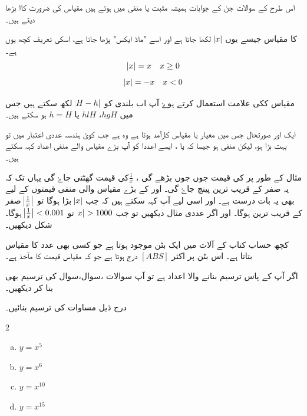 اس طرح کے سوالات جن کے جوابات ہمیشہ مثبت یا منفی میں ہوتے ہیں مقیاس کی ضرورت کاا بڑھا دیتے ہیں۔

 کا مقیاس جیسے یوں \(\abs{x}\) لکھا جاتا ہے اور اسے "ماڈ ایکس" پڑھا جاتا ہے، اسکی تعریف کچھ یوں ہے۔
\[\abs{x}=x\quad x\ge 0\]
\[\abs{x}=-x\quad x<0\]


مقیاس ککی علامت استعمال کرتے ہوۓ آپ اب بلندی کو \( \abs{H-h}  \) لکھ سکتے ہیں جس میں \( hgH \)، \( hlH \) یا \( h= H \) ہو سکتے ہیں۔
 



 ایک اور صورتحال جس میں معیار یا مقیاس کارآمد ہوتا ہے وہ ہے جب کوئ ہندسہ عددی اعتبار میں تو بہت بڑا ہو، لیکن منفی ہو جیسا کہ  یا  ، ایسے اعددا کو آپ بڑے مقیاس والے منفی اعداد کہہ سکتے ہیں۔

مثال کے طور پر  کی قیمت جوں جوں بڑھے گی ، \(\frac{1}{x}\)کی قیمت گھٹتی جاۓ گی یہاں تک کہ یہ صفر کے قریب ترین پینچ جاۓ گی۔ اور   کے بڑے مقیاس والی منفی قیمتوں کے لیے بھی یہ بات درست ہے۔ اور اسی لیے آپ کہہ سکتے ہیں کہ جب \(\abs x\) بڑا ہوگا تو \(\abs{\frac{1}{x}}\) صفر کے قریب ترین ہوگا۔ اور اگر عددی مثال دیکھیں تو جب \(\abs x>1000\) تو \(\abs{\frac{1}{x}}<0.001\) ہوگا۔ شکل  دیکھیں۔

کچھ حساب کتاب کے آلات میں ایک بٹن موجود ہوتا ہے جو کسی بھی عدد کا مقیاس بتاتا ہے۔ اس بٹن پر اکثر \( [ABS]\) درج ہوتا ہے جو کہ مقیاس قیمت کا مآخذ ہے۔


اگر آپ کے پاس ترسیم بنانے والا اعداد ہے تو آپ سوالات ،سوال،سوال کی ترسیم بھی بنا کر دیکھیں۔

درج ذیل مساوات کی ترسیم بنائیں۔
\begin{multicols}{2}
\begin{enumerate}[a.]
\item \(  y=x^{5}\)
\item \( y=x^{6}\)
\item \( y=x^{10}\)
\item \( y=x^{15}\)
\end{enumerate}
\end{multicols}

